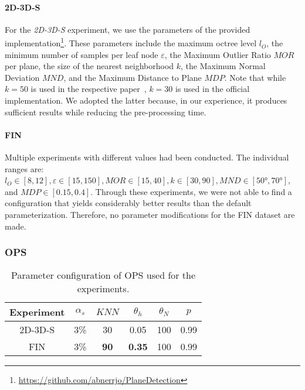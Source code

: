 \documentclass[main.tex]{subfiles}
\begin{document}
\paragraph{2D-3D-S}
For the \textit{2D-3D-S} experiment, we use the parameters of the provided implementation\footnote{\href{https://github.com/abnerrjo/PlaneDetection}{https://github.com/abnerrjo/PlaneDetection}}. These parameters include the maximum octree level $l_O$,
the minimum number of samples per leaf node $\varepsilon$, the Maximum Outlier Ratio $MOR$ per plane, the size of the nearest neighborhood $k$,
the Maximum Normal Deviation $MND$, and the Maximum Distance to Plane $MDP$. Note that while $k=50$ is used in the respective paper~\cite[Section~3.3]{Araújo_Oliveira_2020},
$k=30$ is used in the official implementation. We adopted the latter because, in our experience, it produces sufficient results while reducing the pre-processing time.

\paragraph{FIN}
Multiple experiments with different values had been conducted. The individual ranges are: $l_O \in [8,12], \varepsilon \in [15, 150],
    MOR \in [15, 40], k \in [30, 90], MND \in [50°, 70°]$, and $MDP \in [0.15, 0.4]$.
Through these experiments, we were not able to find a configuration that yields considerably better results than the default
parameterization. Therefore, no parameter modifications for the FIN dataset are made.


\subsubsection{OPS}

\begin{table}[H]
    \centering
    \begin{tabular}{c|ccccc}
        Experiment & $\alpha_s$ & $KNN$       & $\theta_{h}$  & $\theta_{N}$ & $p$  \\ \hline
        2D-3D-S    & 3\%        & 30          & 0.05          & 100          & 0.99 \\
        FIN        & 3\%        & \textbf{90} & \textbf{0.35} & 100          & 0.99
    \end{tabular}%
    \caption{Parameter configuration of OPS used for the experiments.}
    \label{tab:ops-param}
\end{table}
\end{document}
